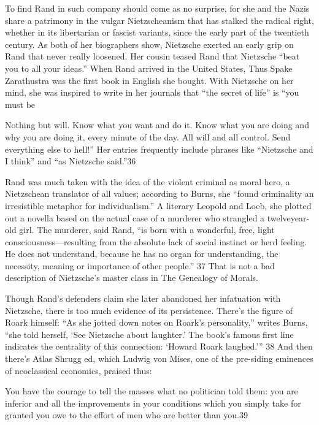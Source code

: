  \par 
To find Rand in such company should come as no surprise, for she and the Nazis share a patrimony in the vulgar Nietzscheanism that has stalked the radical right, whether in its libertarian or fascist variants, since the early part of the twentieth century. As both of her biographers show, Nietzsche exerted an early grip on Rand that never really loosened. Her cousin teased Rand that Nietzsche “beat you to all your ideas.” When Rand arrived in the United States, Thus Spake Zarathustra was the first book in English she bought. With Nietzsche on her mind, she was inspired to write in her journals that “the secret of life” is “you must be
 \par 
Nothing but will. Know what you want and do it. Know what you are doing and why you are doing it, every minute of the day. All will and all control. Send everything else to hell!” Her entries frequently include phrases like “Nietzsche and I think” and “as Nietzsche said.”{\color{blue}36}
 \par 
Rand was much taken with the idea of the violent criminal as moral hero, a Nietzschean translator of all values; according to Burns, she “found criminality an irresistible metaphor for individualism.” A literary Leopold and Loeb, she plotted out a novella based on the actual case of a murderer who strangled a twelveyear-old girl. The murderer, said Rand, “is born with a wonderful, free, light consciousness—resulting from the absolute lack of social instinct or herd feeling. He does not understand, because he has no organ for understanding, the necessity, meaning or importance of other people.” {\color{blue}37} That is not a bad description of Nietzsche’s master class in The Genealogy of Morals.
 \par 
Though Rand’s defenders claim she later abandoned her infatuation with Nietzsche, there is too much evidence of its persistence. There’s the figure of Roark himself: “As she jotted down notes on Roark’s personality,” writes Burns, “she told herself, ‘See Nietzsche about laughter.’ The book’s famous first line indicates the centrality of this connection: ‘Howard Roark laughed.’” {\color{blue}38} And then there’s Atlas Shrugg ed, which Ludwig von Mises, one of the pre-siding eminences of neoclassical economics, praised thus:
 \par 
You have the courage to tell the masses what no politician told them: you are inferior and all the improvements in your conditions which you simply take for granted you owe to the effort of men who are better than you.{\color{blue}39}
